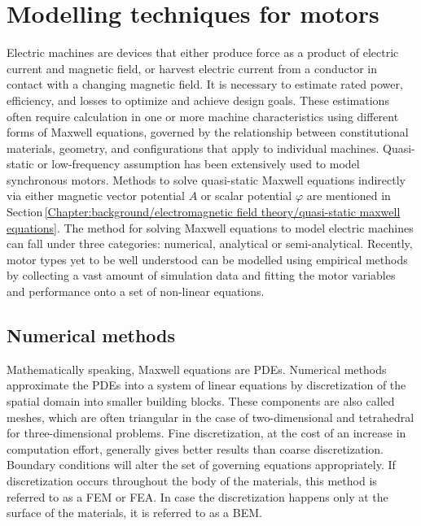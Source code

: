 \section{Modelling techniques for motors}           \label{Chapter:background/modelling techniques for designing motors}


    Electric machines are devices that either produce force as a product of electric current and magnetic field, or harvest electric current from a conductor in contact with a changing magnetic field. It is necessary to estimate rated power, efficiency, and losses to optimize and achieve design goals. These estimations often require calculation in one or more machine characteristics using different forms of Maxwell equations, governed by the relationship between constitutional materials, geometry, and configurations that apply to individual machines. Quasi-static or low-frequency assumption has been extensively used to model synchronous motors. Methods to solve quasi-static Maxwell equations indirectly via either magnetic vector potential $A$ or scalar potential $\varphi$ are mentioned in Section\,\ref{Chapter:background/electromagnetic field theory/quasi-static maxwell equations}. The method for solving Maxwell equations to model electric machines can fall under three categories: numerical, analytical or semi-analytical. Recently, motor types yet to be well understood can be modelled using empirical methods by collecting a vast amount of simulation data and fitting the motor variables and performance onto a set of non-linear equations.


    \subsection{Numerical methods}                  \label{Chapter:background/modelling techniques for designing motors/numerical methods}
    
    
        Mathematically speaking, Maxwell equations are \acsp{PDE}. Numerical methods approximate the \acsp{PDE} into a system of linear equations by discretization of the spatial domain into smaller building blocks. These components are also called meshes, which are often triangular in the case of two-dimensional and tetrahedral for three-dimensional problems. Fine discretization, at the cost of an increase in computation effort, generally gives better results than coarse discretization. Boundary conditions will alter the set of governing equations appropriately. If discretization occurs throughout the body of the materials, this method is referred to as a \ac{FEM} or \ac{FEA}. In case the discretization happens only at the surface of the materials, it is referred to as a \ac{BEM}. 
        

